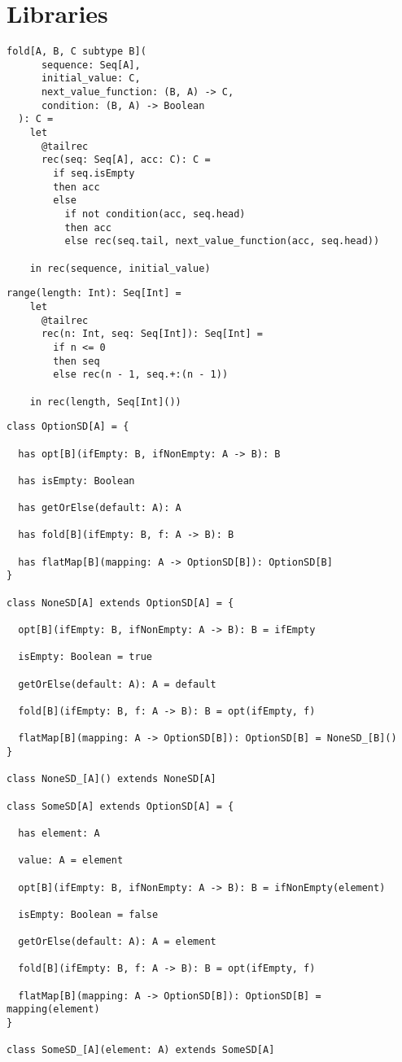 \chapter{Libraries}

\begin{lstlisting}[label={lst:fold}]
  fold[A, B, C subtype B](
      sequence: Seq[A],
      initial_value: C,
      next_value_function: (B, A) -> C,
      condition: (B, A) -> Boolean
  ): C =
    let
      @tailrec
      rec(seq: Seq[A], acc: C): C =
        if seq.isEmpty
        then acc
        else
          if not condition(acc, seq.head)
          then acc
          else rec(seq.tail, next_value_function(acc, seq.head))

    in rec(sequence, initial_value)
\end{lstlisting}

\begin{lstlisting}[label={lst:range}]
  range(length: Int): Seq[Int] =
    let
      @tailrec
      rec(n: Int, seq: Seq[Int]): Seq[Int] =
        if n <= 0
        then seq
        else rec(n - 1, seq.+:(n - 1))

    in rec(length, Seq[Int]())
\end{lstlisting}


\begin{lstlisting}[label={lst:option}]
class OptionSD[A] = {

  has opt[B](ifEmpty: B, ifNonEmpty: A -> B): B

  has isEmpty: Boolean

  has getOrElse(default: A): A

  has fold[B](ifEmpty: B, f: A -> B): B

  has flatMap[B](mapping: A -> OptionSD[B]): OptionSD[B]
}

class NoneSD[A] extends OptionSD[A] = {

  opt[B](ifEmpty: B, ifNonEmpty: A -> B): B = ifEmpty

  isEmpty: Boolean = true

  getOrElse(default: A): A = default

  fold[B](ifEmpty: B, f: A -> B): B = opt(ifEmpty, f)

  flatMap[B](mapping: A -> OptionSD[B]): OptionSD[B] = NoneSD_[B]()
}

class NoneSD_[A]() extends NoneSD[A]

class SomeSD[A] extends OptionSD[A] = {

  has element: A

  value: A = element

  opt[B](ifEmpty: B, ifNonEmpty: A -> B): B = ifNonEmpty(element)

  isEmpty: Boolean = false

  getOrElse(default: A): A = element

  fold[B](ifEmpty: B, f: A -> B): B = opt(ifEmpty, f)

  flatMap[B](mapping: A -> OptionSD[B]): OptionSD[B] = mapping(element)
}

class SomeSD_[A](element: A) extends SomeSD[A]
\end{lstlisting}

